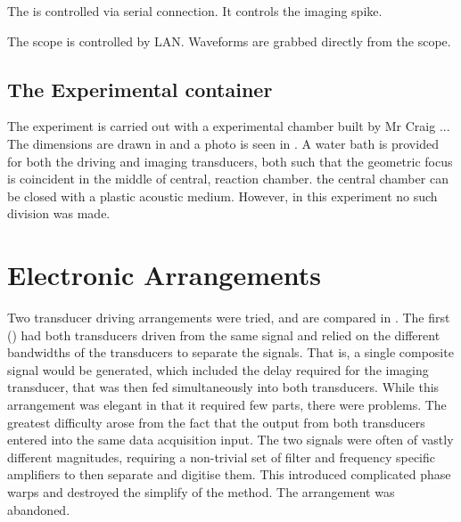 The  is controlled via serial connection.  It controls the imaging spike.

The scope is controlled by LAN. Waveforms are grabbed directly from the scope.










\subsection{The Experimental container}
The experiment is carried out with a experimental chamber built by Mr Craig ...
The dimensions are drawn in 
and a photo is seen in .
A water bath is provided for both the driving and imaging transducers,
both such that the geometric focus is coincident in the middle of central,
reaction chamber.
the central chamber can be closed with a plastic acoustic medium.
However,
in this experiment no such division was made.

\section{Electronic Arrangements}


Two transducer driving arrangements were tried, and  are compared in .
The first () had both transducers driven from the same signal 
and relied on the different bandwidths of the transducers to separate the signals.
That is, a single composite signal would be generated, which included the delay required for the imaging transducer,
that was then fed simultaneously into both transducers.
While this arrangement was elegant in that it required few parts, there were problems.
The greatest difficulty arose from the fact that the output from both  transducers entered into the same data acquisition input.
The two signals were often of vastly different magnitudes,
requiring a non-trivial set of filter and frequency specific amplifiers to then separate and digitise them. %
This introduced complicated phase warps and destroyed the simplify of the method.  The arrangement was abandoned.

